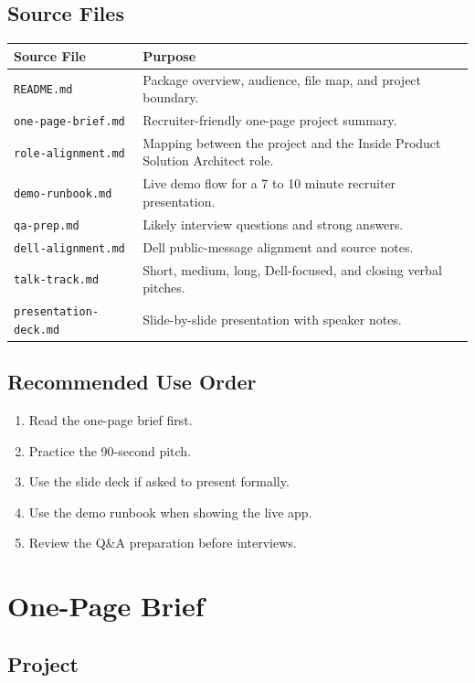 \documentclass[11pt,a4paper]{article}
\begin{document}
\subsection{Source Files}

\begin{longtable}{p{}p{}}
\toprule
\textbf{Source File} & \textbf{Purpose} \\
\midrule
\texttt{README.md} & Package overview, audience, file map, and project boundary. \\
\texttt{one-page-brief.md} & Recruiter-friendly one-page project summary. \\
\texttt{role-alignment.md} & Mapping between the project and the Inside Product Solution Architect role. \\
\texttt{demo-runbook.md} & Live demo flow for a 7 to 10 minute recruiter presentation. \\
\texttt{qa-prep.md} & Likely interview questions and strong answers. \\
\texttt{dell-alignment.md} & Dell public-message alignment and source notes. \\
\texttt{talk-track.md} & Short, medium, long, Dell-focused, and closing verbal pitches. \\
\texttt{presentation-deck.md} & Slide-by-slide presentation with speaker notes. \\
\bottomrule
\end{longtable}

\subsection{Recommended Use Order}

\begin{enumerate}
  \item Read the one-page brief first.
  \item Practice the 90-second pitch.
  \item Use the slide deck if asked to present formally.
  \item Use the demo runbook when showing the live app.
  \item Review the Q\&A preparation before interviews.
\end{enumerate}

\section{One-Page Brief}

\subsection{Project}
\end{document}
